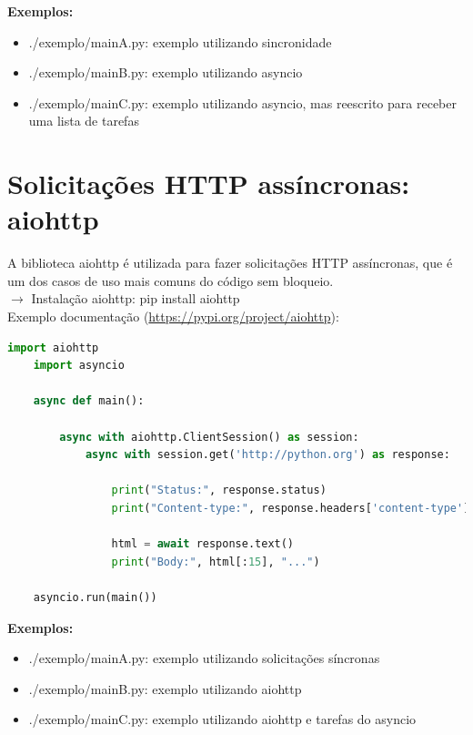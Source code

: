\documentclass{beamer}
\begin{document}
	\alert{\textbf{Exemplos:}} \\
	\begin{itemize}
		\item ./exemplo/main\textunderscore A.py: exemplo utilizando sincronidade \\
		\item ./exemplo/main\textunderscore B.py: exemplo utilizando asyncio \\
		\item ./exemplo/main\textunderscore C.py: exemplo utilizando asyncio, mas reescrito para receber uma lista de tarefas\\
 	\end{itemize}
	\newpage

	\section{Solicitações HTTP assíncronas: aiohttp}
	A biblioteca aiohttp é utilizada para fazer solicitações HTTP assíncronas, que é um dos casos de uso mais comuns do código sem bloqueio. \\
	$\rightarrow$ Instalação aiohttp: pip install aiohttp \\
	Exemplo documentação (\url{https://pypi.org/project/aiohttp}):
	\begin{lstlisting}[language=Python, mathescape=true, breaklines=true, basicstyle=\tiny]
	import aiohttp
	import asyncio

	async def main():

    	async with aiohttp.ClientSession() as session:
        	async with session.get('http://python.org') as response:

            	print("Status:", response.status)
            	print("Content-type:", response.headers['content-type'])

            	html = await response.text()
            	print("Body:", html[:15], "...")

	asyncio.run(main())
	\end{lstlisting}

	\alert{\textbf{Exemplos:}} \\
	\begin{itemize}
		\item ./exemplo/main\textunderscore A.py: exemplo utilizando solicitações síncronas \\
		\item ./exemplo/main\textunderscore B.py: exemplo utilizando aiohttp \\
		\item ./exemplo/main\textunderscore C.py: exemplo utilizando aiohttp e tarefas do asyncio \\
 	\end{itemize}
	\newpage
	
\end{document}
